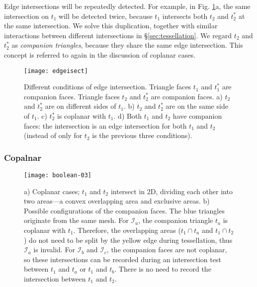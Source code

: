 Edge intersections will be repeatedly detected. For example, in Fig. \ref{fig:twin}a, the same intersection on $t_1$ will be detected twice, because $t_1$ intersects both $t_2$ and $t_2^*$ at the same intersection. We solve this duplication, together with similar interactions between different intersections in \S\ref{sec:tessellation}. We regard $t_2$ and $t_2^*$ as \emph{companion triangles}, because they share the same edge intersection. This concept is referred to again in the discussion of coplanar cases.

\begin{figure}[t]
\centering
\texttt{[image: edgeisect]}
\caption{Different conditions of edge intersection. Triangle faces $t_1$ and $t_1^*$ are companion faces. Triangle faces $t_2$ and $t_2^*$ are companion faces. a) $t_2$ and $t_2^*$ are on different sides of $t_1$. b) $t_2$ and $t_2^*$ are on the same side of $t_1$. c) $t_2^*$ is coplanar with $t_1$. d) Both $t_1$ and $t_2$ have companion faces: the intersection is an edge intersection for both $t_1$ and $t_2$ (instead of only for $t_2$ is the previous three conditions). }
\label{fig:twin}
\end{figure}


\subsubsection{Copalnar}

\begin{figure}[t]
\centering
\texttt{[image: boolean-03]}
\caption{a) Coplanar cases; $t_1$ and $t_2$ intersect in 2D, dividing each other into two areas---a convex overlapping area and exclusive areas. b) Possible configurations of the companion faces. The blue triangles originate from the same mesh. For $\mathcal{I}_a$, the companion triangle $t_a$ is coplanar with $t_1$. Therefore, the overlapping areas ($t_1 \cap t_a$ and $t_1 \cap t_2$) do not need to be split by the yellow edge during tessellation, thus $\mathcal{I}_a$ is invalid. For $\mathcal{I}_b$ and $\mathcal{I}_c$, the companion faces are not coplanar, so these intersections can be recorded during an intersection test between $t_1$ and $t_a$ or $t_1$ and $t_b$. There is no need to record the intersection between $t_1$ and $t_2$.}
\label{fig:coplanar}
\end{figure}

